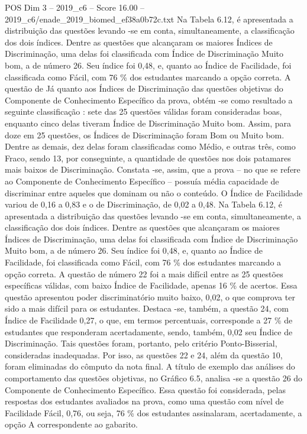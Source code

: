\begin{textsample}{POS Dim 3 – 2019\_c6 – Score 16.00 – 2019\_c6/enade\_2019\_biomed\_ef38a0b72c.txt}
Na Tabela 6.12, é apresentada a distribuição das questões levando -se em conta, simultaneamente, a classificação dos dois índices.
Dentre as questões que alcançaram os maiores Índices de Discriminação, uma delas foi classificada com Índice de Discriminação Muito bom, a de número 26.
Seu índice foi 0,48, e, quanto ao Índice de Facilidade, foi classificada como Fácil, com 76 \% dos estudantes marcando a opção correta.
A questão de Já quanto aos Índices de Discriminação das questões objetivas do Componente de Conhecimento Específico da prova, obtém -se como resultado a seguinte classificação : sete das 25 questões válidas foram consideradas boas, enquanto cinco delas tiveram Índice de Discriminação Muito bom.
Assim, para doze em 25 questões, os Índices de Discriminação foram Bom ou Muito bom.
Dentre as demais, dez delas foram classificadas como Médio, e outras três, como Fraco, sendo 13, por conseguinte, a quantidade de questões nos dois patamares mais baixos de Discriminação.
Constata -se, assim, que a prova – no que se refere ao Componente de Conhecimento Específico – possuía média capacidade de discriminar entre aqueles que dominam ou não o conteúdo.
O Índice de Facilidade variou de 0,16 a 0,83 e o de Discriminação, de 0,02 a 0,48.
Na Tabela 6.12, é apresentada a distribuição das questões levando -se em conta, simultaneamente, a classificação dos dois índices.
Dentre as questões que alcançaram os maiores Índices de Discriminação, uma delas foi classificada com Índice de Discriminação Muito bom, a de número 26.
Seu índice foi 0,48, e, quanto ao Índice de Facilidade, foi classificada como Fácil, com 76 \% dos estudantes marcando a opção correta.
A questão de número 22 foi a mais difícil entre as 25 questões específicas válidas, com baixo Índice de Facilidade, apenas 16 \% de acertos.
Essa questão apresentou poder discriminatório muito baixo, 0,02, o que comprova ter sido a mais difícil para os estudantes.
Destaca -se, também, a questão 24, com Índice de Facilidade 0,27, o que, em termos percentuais, corresponde a 27 \% de estudantes que responderam acertadamente, sendo, também, 0,02 seu Índice de Discriminação.
Tais questões foram, portanto, pelo critério Ponto-Bisserial, consideradas inadequadas.
Por isso, as questões 22 e 24, além da questão 10, foram eliminadas do cômputo da nota final.
A título de exemplo das análises do comportamento das questões objetivas, no Gráfico 6.5, analisa -se a questão 26 do Componente de Conhecimento Específico.
Essa questão foi considerada, pelas respostas dos estudantes avaliados na prova, como uma questão com nível de Facilidade Fácil, 0,76, ou seja, 76 \% dos estudantes assinalaram, acertadamente, a opção A correspondente ao gabarito.

\end{textsample}
